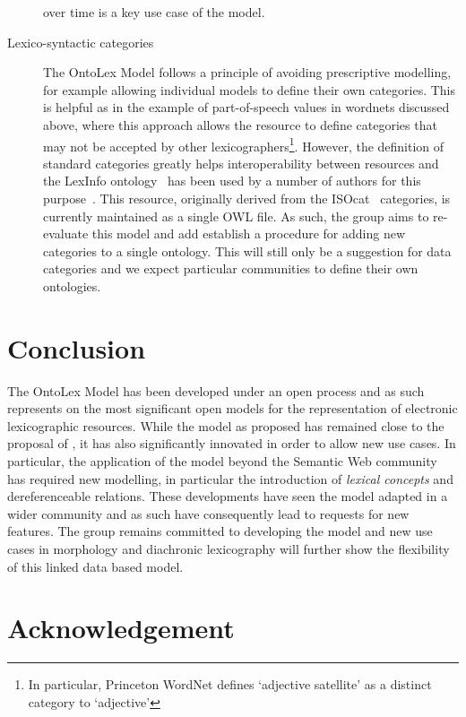 \documentclass[12pt,a4paper]{elex2017}
\begin{document}
\begin{description}
        over time is a key use case of the model.
    \item[Lexico-syntactic categories] The OntoLex Model follows a principle of
        avoiding prescriptive modelling, for example allowing individual models
        to define their own categories. This is helpful as in the example
        of part-of-speech values in wordnets discussed above, where this
        approach allows the resource to define categories that may not be
        accepted by other lexicographers\footnote{In particular, Princeton
        WordNet defines `adjective satellite' as a distinct category to
        `adjective'}. However, the definition of standard categories greatly
        helps interoperability between resources and the LexInfo
        ontology~\citep{cimiano2011lexinfo} has been used by a number of authors
        for this
        purpose~\citep{buitelaar2013linguistic,villegas2015parole,serasset2015dbnary}. 
        This resource, originally derived from the
        ISOcat~\citep{kemps2008isocat} categories, is currently maintained as a
        single OWL file. As such, the group aims to re-evaluate this model and
        add establish a procedure for adding new categories to a single
        ontology. This will still only be a suggestion for data categories
        and we expect particular communities to define their own ontologies.
\end{description}

\section{Conclusion}

The OntoLex Model has been developed under an open process and as such
represents on the most significant open models for the representation of
electronic lexicographic resources. While the model as proposed has remained
close to the proposal of \cite{mccrae2012interchanging}, it has also
significantly innovated in order to allow new use cases. In particular, the
application of the model beyond the Semantic Web community has required new
modelling, in particular the introduction of \emph{lexical concepts} and
dereferenceable relations. These developments have seen the model adapted in a
wider community and as such have consequently lead to requests for new features.
The group remains committed to developing the model and new use cases in
morphology and diachronic lexicography will further show the flexibility of this
linked data based model.

\section*{Acknowledgement} 
\end{document}
